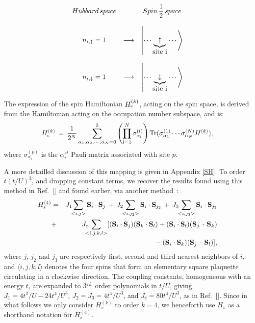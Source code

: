 \documentclass[aps,prb,twocolumn,superscriptaddress,
               amsmath]{revtex4}
\newcommand{\eqn}[1]{\vspace{-0.cm}\begin{equation}
#1
\end{equation}}
\renewcommand{\=}{\,=\,}
\newcommand{\+}{\,+\,}
\renewcommand{\-}{\,-\,}
\newcommand{\f}[2]{{\ensuremath{\mathchoice%
        {\dfrac{#1}{#2}}
        {\dfrac{#1}{#2}}
        {\frac{#1}{#2}}
        {\frac{#1}{#2}}
        }}}
\newcommand{\ket}[1]{\ensuremath{\left| #1 \right\rangle}}
\begin{document}
\eqn{
\begin{array}{ccc}
Hubbard\, space & & Spin\,\f{1}{2} \,space  \\
\\
n_{i,\uparrow} = 1 & \longrightarrow &  \ket{\cdots\underbrace{\uparrow}_{\mbox{site
i}}\cdots}  \\
\\
n_{i,\downarrow} = 1  & \longrightarrow &
\ket{\cdots\underbrace{\downarrow}_{\mbox{site i}}\cdots}
\end{array}
\label{corres}}


The expression of the spin Hamiltonian $H_{\rm s}^{(k)}$, acting on the
spin space, is derived from the Hamiltonian acting on the occupation
number subspace, and is:
\eqn{
H_{\rm s}^{(k)} \=\f{1}{2^N}
\sum_{\alpha_1,\alpha_2,\cdots,\alpha_N = 0}^3 \left(\prod_{l=1}^N
\sigma_{\alpha_l}^{(l)}\right) {\rm Tr}(\sigma_{\alpha_1}^{(1)} \cdots
\sigma_{\alpha_N}^{(N)} H^{(k)}),\label{Tr}
}
where $\sigma_{\alpha_i}^{(p)}$ is the $\alpha_i^{st}$
Pauli matrix associated with site $p$.

A more detailled discussion 
of this mapping is given in Appendix \ref{SH}.
To order $t(t/U)^3$, and dropping constant terms, we recover the results found
using this method in Ref.~[] and found earlier, via another method~\cite{taka}:
\begin{eqnarray}
H_{\rm s}^{(4)}&=&J_1 \!\! \sum_{<i,j>} {\bf S}_i\cdot{\bf S}_j \,+\, J_2 \!\! \sum_{<i,j_2>}
{\bf S}_i\cdot{\bf S}_{j_2} \,+\, J_3 \!\! \sum_{<i,j_3>}
{\bf S}_i\cdot{\bf S}_{j_3}\nonumber\\
&+&J_c \!\!\!\! \sum_{<i,j,k,l>}
[({\bf S}_i \cdot {\bf S}_j)
({\bf S}_k \cdot {\bf S}_l)+({\bf S}_i \cdot {\bf S}_l)
({\bf S}_j\,\cdot\,{\bf S}_k) \nonumber \\
&& \hspace{43pt}\,-\,  ({\bf S}_i \cdot {\bf S}_k)
({\bf S}_j\,\cdot\,{\bf S}_l)
],
\label{Hso}
\end{eqnarray}
where $j$,  $j_2$ and  $j_3$ are respectively first, second and
third nearest-neighbors of $i$, and $\langle
i,j,k,l\rangle$ denotes the four spins that form an elementary
square plaquette circulating in a clockwise direction. The
coupling constants, homogeneous with an energy $t$, are expanded
to 3$^{\rm rd}$ order polynomials in $t/U$, giving
$J_1=4t^2/U-24t^4/U^3$, $J_2=J_3=4t^4/U^3$, and $J_c=80 t^4/U^3$,
 as in
Ref.~[].
Since in what follows we only consider $H_s^{(k)}$ to order
$k=4$, we henceforth use $H_s$ as a shorthand notation for
$H_s^{(4)}$.
\end{document}
